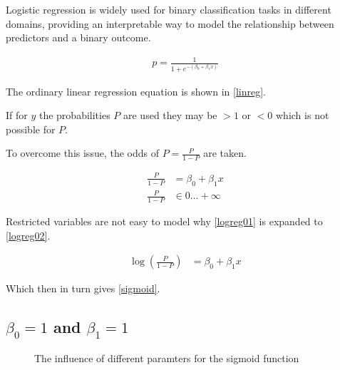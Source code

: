 \documentclass[
  a4paper,
]{scrbook}
\begin{document}
Logistic regression is widely used for binary classification tasks in
different domains, providing an interpretable way to model the
relationship between predictors and a binary outcome.

\begin{align}
p = \frac{1}{1+e^{-(\beta_0 + \beta_1x)}} \label{sigmoid}
\end{align}

The ordinary linear regression equation is shown in \eqref{linreg}.

If for \(y\) the probabilities \(P\) are used they may be \(>1\) or
\(<0\) which is not possible for \(P\).

To overcome this issue, the odds of \(P = \frac{P}{1-P}\) are taken.

\begin{align}
\frac{P}{1-P} &= \beta_0 + \beta_1x \label{logreg01} \\
\frac{P}{1-P} &\in {0 \ldots + \infty} \nonumber
\end{align}

Restricted variables are not easy to model why \eqref{logreg01} is
expanded to \eqref{logreg02}.

\begin{align}
\log\left( \frac{P}{1-P}\right) &= \beta_0 + \beta_1x \label{logreg02}
\end{align}

Which then in turn gives \eqref{sigmoid}.

\newpage{}

\subsection{\texorpdfstring{\(\beta_0 = 1\) and
\(\beta_1 = 1\)}{\textbackslash beta\_0 = 1 and \textbackslash beta\_1 = 1}}\label{beta_0-1-and-beta_1-1}

\begin{figure}[H]


\caption{\label{fig-sigmoid-params}The influence of different paramters
for the sigmoid function}

\end{figure}%
\end{document}
